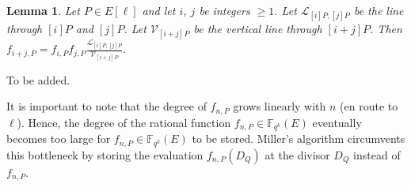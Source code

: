 \documentclass[11pt, lettersize, notitlepage, leqno, footskip=0.6cm]{article}
\newcommand{\bFqk}{\mathbb{F}_{q^k}}
\newcommand{\mc}{\mathcal}
\newtheorem{Lem}[Thm]{Lemma}
\numberwithin{equation}{section}
\begin{document}
\begin{Lem} Let $P\in E[\ell]$ and let $i$, $j$ be integers $\geq 1$. Let $\mc{L}_{[i]P, [j]P}$ be the line through $[i]P$ and $[j]P$. Let $\mc{V}_{[i+j]P}$ be the vertical line through $[i+j]P$. Then $f_{i+j,P} = f_{i,P}f_{j,P}\frac{\mc{L}_{[i]P, [j]P}}{\mc{V}_{[i+j]P}}$.\end{Lem}

\begin{prf} To be added.  \end{prf}

It is important to note that the degree of $f_{n,P}$ grows linearly with $n$ (en route to $\ell$). Hence, the degree of the rational function $f_{n,P}\in \bFqk(E)$ eventually becomes too large for $f_{n,P}\in \bFqk(E)$ to be stored. Miller's algorithm circumvents this bottleneck by storing the evaluation $f_{n,P}(D_Q)$ at the divisor $D_Q$ instead of $f_{n,P}$. 



\bigskip
\end{document}

